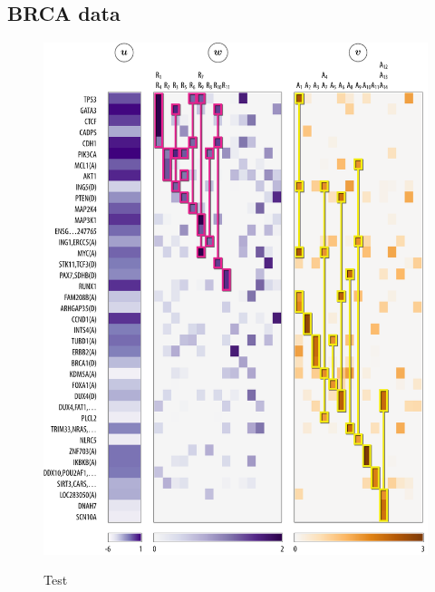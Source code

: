 \subsection{BRCA data}
\begin{figure}[htb]
\includegraphics[width=\textwidth]{figures/genes/mat_brca.pdf}\\[2em]
\caption{Test}
\end{figure}

